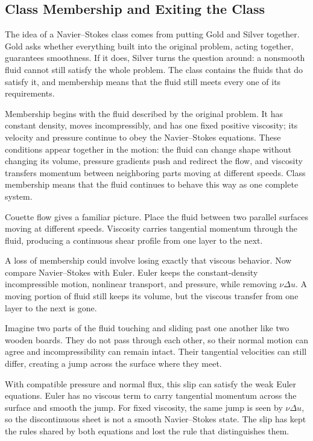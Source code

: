 \subsection{Class Membership and Exiting the Class}

The idea of a Navier--Stokes class comes from putting Gold and Silver together.
Gold asks whether everything built into the original problem, acting together, guarantees smoothness.
If it does, Silver turns the question around: a nonsmooth fluid cannot still satisfy the whole problem.
The class contains the fluids that do satisfy it, and membership means that the fluid still meets every one of its requirements.

Membership begins with the fluid described by the original problem.
It has constant density, moves incompressibly, and has one fixed positive viscosity; its velocity and pressure continue to obey the Navier--Stokes equations.
These conditions appear together in the motion: the fluid can change shape without changing its volume, pressure gradients push and redirect the flow, and viscosity transfers momentum between neighboring parts moving at different speeds.
Class membership means that the fluid continues to behave this way as one complete system.

Couette flow gives a familiar picture.
Place the fluid between two parallel surfaces moving at different speeds.
Viscosity carries tangential momentum through the fluid, producing a continuous shear profile from one layer to the next.

A loss of membership could involve losing exactly that viscous behavior.
Now compare Navier--Stokes with Euler.
Euler keeps the constant-density incompressible motion, nonlinear transport, and pressure, while removing \(\nu\Delta u\).
A moving portion of fluid still keeps its volume, but the viscous transfer from one layer to the next is gone.

Imagine two parts of the fluid touching and sliding past one another like two wooden boards.
They do not pass through each other, so their normal motion can agree and incompressibility can remain intact.
Their tangential velocities can still differ, creating a jump across the surface where they meet.

With compatible pressure and normal flux, this slip can satisfy the weak Euler equations.
Euler has no viscous term to carry tangential momentum across the surface and smooth the jump.
For fixed viscosity, the same jump is seen by \(\nu\Delta u\), so the discontinuous sheet is not a smooth Navier--Stokes state.
The slip has kept the rules shared by both equations and lost the rule that distinguishes them.


